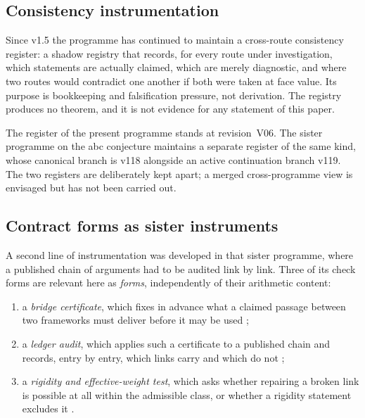 \documentclass[12pt,a4paper]{article}
\theoremstyle{definition}
\theoremstyle{remark}
\begin{document}
\subsection{Consistency instrumentation}

Since v1.5 the programme has continued to maintain a cross-route
consistency register: a shadow registry that records, for every route
under investigation, which statements are actually claimed, which are
merely diagnostic, and where two routes would contradict one another if
both were taken at face value.  Its purpose is bookkeeping and
falsification pressure, not derivation.  The registry produces no
theorem, and it is not evidence for any statement of this paper.

The register of the present programme stands at revision~V06.  The
sister programme on the abc conjecture maintains a separate register of
the same kind, whose canonical branch is v118 alongside an active
continuation branch v119.  The two registers are deliberately kept
apart; a merged cross-programme view is envisaged but has not been
carried out.

\subsection{Contract forms as sister instruments}

A second line of instrumentation was developed in that sister
programme, where a published chain of arguments had to be audited link
by link.  Three of its check forms are relevant here as \emph{forms},
independently of their arithmetic content:
\begin{enumerate}[label=(C\arabic*)]
\item a \emph{bridge certificate}, which fixes in advance what a claimed
  passage between two frameworks must deliver before it may be used
  \cite{Geiger2026bridge};
\item a \emph{ledger audit}, which applies such a certificate to a
  published chain and records, entry by entry, which links carry and
  which do not \cite{Geiger2026ledger};
\item a \emph{rigidity and effective-weight test}, which asks whether
  repairing a broken link is possible at all within the admissible
  class, or whether a rigidity statement excludes it
  \cite{Geiger2026rigidity}.
\end{enumerate}
\end{document}
